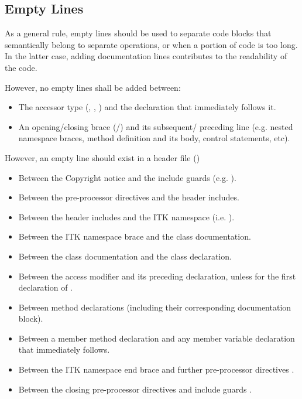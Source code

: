 \subsection{Empty Lines}
\label{subsec:EmptyLines}

As a general rule, empty lines should be used to separate code blocks that
semantically belong to separate operations, or when a portion of code is
too long. In the latter case, adding documentation lines contributes to the
readability of the code.

However, no empty lines shall be added between:
\begin{itemize}
\item The accessor type (, , ) and
the declaration that immediately follows it.
\item An opening/closing brace (\code{\{}/\code{\}}) and its subsequent/
preceding line (e.g. nested namespace braces, method definition and its body,
control statements, etc).
\end{itemize}

However, an empty line should exist in a header file ()
\begin{itemize}
\item Between the Copyright notice and the include guards (e.g.
).
\item Between the pre-processor directives and the header includes.
\item Between the header includes and the ITK namespace (i.e.
).
\item Between the ITK namespace brace and the class documentation.
\item Between the class documentation and the class declaration.
\item Between the access modifier and its preceding declaration, unless for the
first declaration of .
\item Between method declarations (including their corresponding documentation
block).
\item Between a member method declaration and any member variable declaration
that immediately follows.
\item Between the ITK namespace end brace  and
further pre-processor directives .
\item Between the closing pre-processor directives and include guards .
\end{itemize}

